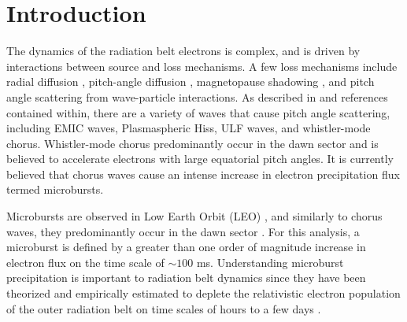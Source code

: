 \documentclass[draft,linenumbers]{agujournal}
\begin{document}
%
% 
% 
% 

\section{Introduction}
The dynamics of the radiation belt electrons is complex, and is driven by interactions between source and loss mechanisms. A few loss mechanisms include radial diffusion \citep{Shprits04}, pitch-angle diffusion \citep{Selesnick03}, magnetopause shadowing \citep{Ukhorskiy06}, and pitch angle scattering from wave-particle interactions. As described in \citep{Millan07, Thorne10} and references contained within, there are a variety of waves that cause pitch angle scattering, including EMIC waves, Plasmaspheric Hiss, ULF waves, and whistler-mode chorus. Whistler-mode chorus predominantly occur in the dawn sector \citep{Li09} and is believed to accelerate electrons with large equatorial pitch angles\citep{Horne03}. It is currently believed that chorus waves cause an intense increase in electron precipitation flux termed microbursts. 

Microbursts are observed in Low Earth Orbit (LEO) \citep{Nakamura95, Nakamura00, Blake96, Lorentzen01a, Lorentzen01b, O'Brien03, O'Brien04, Blum15, Crew16}, and similarly to chorus waves, they predominantly occur in the dawn sector \citep{Lorentzen01b}. For this analysis, a microburst is defined by a greater than one order of magnitude increase in electron flux on the time scale of $\sim 100$ ms. Understanding microburst precipitation is important to radiation belt dynamics since they have been theorized and empirically estimated to deplete the relativistic electron population of the outer radiation belt on time scales of hours to a few days \citep{O'Brien04, Thorne05, Shprits07}.
\end{document}
